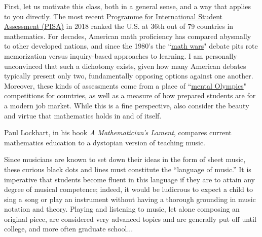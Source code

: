 \documentclass[11pt]{article}
\theoremstyle{plain}
\theoremstyle{definition}
\theoremstyle{remark}
\begin{document}
First, let us motivate this class, both in a general sense, and a way that applies to you directly. The most recent \href{https://hechingerreport.org/what-2018-pisa-international-rankings-tell-us-about-u-s-schools/}{Programme for International Student Assessment (PISA)} in 2018 ranked the U.S. at 36th out of 79 countries in mathematics. For decades, American math proficiency has compared abysmally to other developed nations, and since the 1980's the ``\href{https://en.wikipedia.org/wiki/Math_wars}{math wars}" debate pits rote memorization versus inquiry-based approaches to learning. I am personally unconvinced that such a dichotomy exists, given how many American debates typically present only two, fundamentally opposing options against one another. Moreover, these kinds of assessments come from a place of ``\href{http://neatoday.org/2019/12/03/2018-pisa-results/}{mental Olympics}" competitions for countries, as well as a measure of how prepared students are for a modern job market.  While this is a fine perspective, also consider the beauty and virtue that mathematics holds in and of itself. 

Paul Lockhart, in his book {\it A Mathematician's Lament}, compares current mathematics education to a dystopian version of teaching music.\\
\setlength{\leftskip}{1cm}

Since musicians are known to set down their ideas in the form of sheet music, these curious black dots and lines must constitute the ``language of music.” It is imperative that students become fluent in this language if they are to attain any degree of musical competence; indeed, it would be ludicrous to expect a child to sing a song or play an instrument without having a thorough grounding in music notation and theory. Playing and listening to music, let alone composing an original piece, are considered very advanced topics and are generally put off until college, and more often graduate school...
\end{document}

